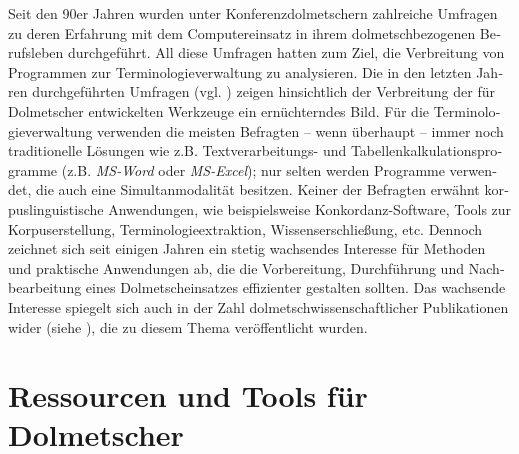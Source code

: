 \documentclass[output=paper]{LSP/langsci}
\begin{document}
\begin{otherlanguage}{ngerman}
Seit den 90er Jahren wurden unter Konferenzdolmetschern zahlreiche Umfragen zu deren Erfahrung mit dem Computereinsatz in ihrem dolmetschbezogenen Berufsleben durchgeführt. All diese Umfragen hatten zum Ziel, die Verbreitung von Programmen zur Terminologieverwaltung zu analysieren. Die in den letzten Jahren durchgeführten Umfragen (vgl. \citealt{Valentini2002,Honegger2006,SDI2007,Bilgen2009}) zeigen hinsichtlich der Verbreitung der für Dolmetscher entwickelten Werkzeuge ein ernüchterndes Bild. Für die Terminologieverwaltung verwenden die meisten Befragten -- wenn überhaupt -- immer noch traditionelle Lösungen wie z.B. Textverarbeitungs- und Tabellenkalkulationsprogramme (z.B.\textit{ MS-Word} oder \textit{MS-Excel}); nur selten werden Programme verwendet, die auch eine Simultanmodalität besitzen. Keiner der Befragten erwähnt korpuslinguistische Anwendungen, wie beispielsweise Konkordanz-Software, Tools zur Korpuserstellung, Terminologieextraktion, Wissenserschließung, etc. Dennoch zeichnet sich seit einigen Jahren ein stetig wachsendes Interesse für Methoden und praktische Anwendungen ab, die die Vorbereitung, Durchführung und Nachbearbeitung eines Dolmetscheinsatzes effizienter gestalten sollten. Das wachsende Interesse spiegelt sich auch in der Zahl dolmetschwissenschaftlicher Publikationen wider (siehe ), die zu diesem Thema veröffentlicht wurden.

\section{Ressourcen und Tools für Dolmetscher}\label{sec:fantinuoli:4}
\largerpage


\end{otherlanguage}
\end{document}
